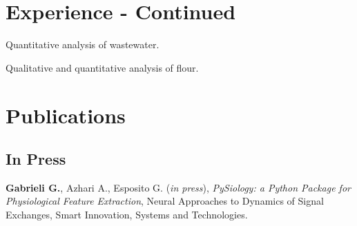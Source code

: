\documentclass[a4paper]{deedy-resume} %
\begin{document}
\begin{minipage}[t]{0.03\textwidth} %
\end{minipage} %
\hfill
\begin{minipage}[t]{0.63\textwidth} %

\section{Experience - Continued}

\sectionspace


Quantitative analysis of wastewater.

\sectionspace %
 
Qualitative and quantitative analysis of flour.  

\sectionspace

\section{Publications}
	\sectionspace
	\begin{tightitemize}
		\subsection{In Press}
			\item \textbf{Gabrieli G.}, Azhari A., Esposito G. (\textit{in press}), \textit{PySiology: a Python Package for Physiological Feature Extraction}, Neural Approaches to Dynamics of Signal Exchanges, Smart Innovation, Systems and Technologies.\\
		
	    

\end{tightitemize}
\end{minipage}
\end{document}
